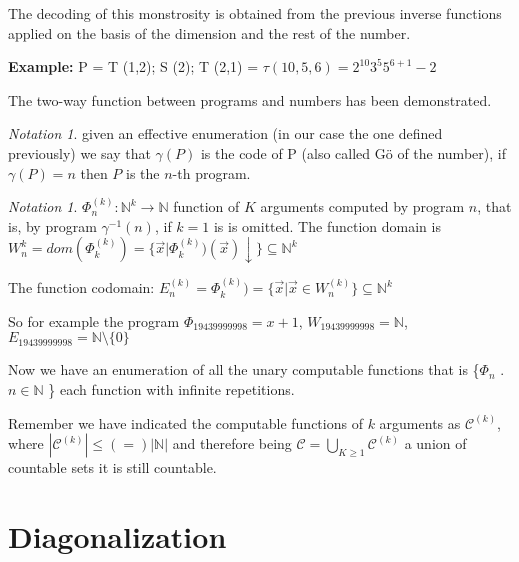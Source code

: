 \documentclass{amsbook}
\newcommand{\nat}{\ensuremath{\mathbb{N}}}
\theoremstyle{definition}
\theoremstyle{remark}
\newtheorem{notation}[theorem]{Notation}
\numberwithin{section}{chapter}
\numberwithin{equation}{chapter}
\begin{document}
The decoding of this monstrosity is obtained from the previous inverse functions applied on the basis of the dimension and the rest of the number.

\textbf{Example:} P = T (1,2); S (2); T (2,1) = $ \tau(10,5,6) = 2^{10} 3^5 5^{6+1} -2 $

The two-way function between programs and numbers has been demonstrated.

\begin{notation} given an effective enumeration (in our case the one defined previously) we say that $ \gamma(P) $ is the code of P (also called G\"{o} of the number), if $ \gamma(P) = n $ then $P$ is the $n$-th program.
\end{notation}

\begin{notation} $ \Phi_n^{(k)}: \nat^k\rightarrow\nat $ function of $K$ arguments computed by program $n$, that is, by program $ \gamma^{-1}(n) $, if $k = 1$ is is omitted. The function domain  is $ W_n^{k} = dom(\Phi_k^{(k)}) = \{\vec{x} | \Phi_k^{(k)})(\vec{x})\downarrow  \} \subseteq \nat^k$

The function codomain: $ E^{(k)}_n = \Phi_k^{(k)}) = \{\vec{x} | \vec{x} \in W_n^{(k)} \} \subseteq \nat^k$
\end{notation}

So for example the program $ \Phi_{19439999998} = x+1 $, $ W_{19439999998} = \nat $, $ E_{19439999998} = \nat \setminus \{0\} $

Now we have an enumeration of all the unary computable functions that is \{$ \Phi_n $ . $ n \in \nat $ \} each function with infinite repetitions.

Remember we have indicated the computable functions of $k$ arguments as $ \mathcal{C} ^ {(k)} $, where $ | \mathcal{C} ^ {(k)} | \leq (=) | \nat | $ and therefore being $ \mathcal{C} = \bigcup_{K \geq 1} \mathcal{C} ^ {(k)} $ a union of countable sets it is still countable.

\chapter{Diagonalization}
\end{document}
